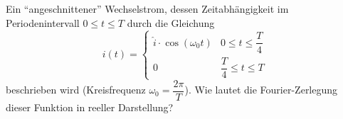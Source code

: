 \begin{ejercicio}
    Ein ``angeschnittener'' Wechselstrom, dessen Zeitabhängigkeit im Periodenintervall $0 \leq t \leq T$ durch die Gleichung
    \begin{equation*}
        i(t) =
        \begin{cases}
            \hat{i} \cdot \cos (\omega_0 t) & 0 \leq t \leq \dfrac{T}{4} \\
            0 & \dfrac{T}{4} \leq t \leq T
        \end{cases}
    \end{equation*}
    beschrieben wird (Kreisfrequenz $\omega_0 = \dfrac{2\pi}{T}$). Wie lautet die Fourier-Zerlegung dieser Funktion in reeller Darstellung?
\end{ejercicio}